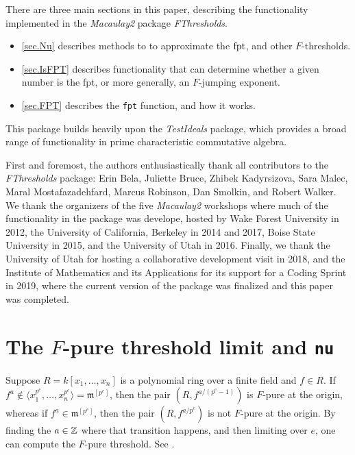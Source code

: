 \documentclass{amsart}
\newcommand{\fram}{\mathfrak{m}}
\begin{document}
There are three main sections in this paper, describing the functionality implemented in the \emph{Macaulay2} package \emph{FThresholds}. 
\begin{itemize}
\item{} \autoref{sec.Nu} describes methods to to approximate the $\operatorname{{fpt}}$, and other $F$-thresholds.  
\item{} \autoref{sec.IsFPT} describes functionality that can determine whether a given number is the fpt, or more generally, an $F$-jumping exponent.
\item{} \autoref{sec.FPT} describes the {\tt fpt} function, and how it works.
\end{itemize}

This package builds heavily upon the \emph{TestIdeals} package, which provides a broad range of functionality in prime characteristic commutative algebra. 


  First and foremost, the authors enthusiastically thank all contributors to the \emph{FThresholds} package:  Erin Bela, Juliette Bruce, Zhibek Kadyrsizova, Sara Malec, Maral Mostafazadehfard, Marcus Robinson, Dan Smolkin, and Robert Walker.  We thank the organizers of the five \emph{Macaulay2} workshops where much of the functionality in the package was develope, hosted by Wake Forest University in 2012, the University of California, Berkeley in 2014 and 2017, Boise State University in 2015, and the University of Utah in 2016. 
Finally, we thank the University of Utah for hosting a collaborative development visit in 2018, and the Institute of Mathematics and its Applications for its support for a Coding Sprint in 2019, where the current version of the package was finalized and this paper was completed. 

\section{The $F$-pure threshold limit and {\tt nu}}
\label{sec.Nu}

Suppose $R = k[x_1, \dots, x_n]$ is a polynomial ring over a finite field and $f \in R$.    If $f^a \notin \langle x_1^{p^e}, \dots, x_n^{p^e} \rangle = \fram^{[p^e]}$, then the pair $(R, f^{a/(p^e -1)})$ is $F$-pure at the origin, whereas if $f^a \in \fram^{[p^e]}$, then the pair $(R, f^{a/p^e})$ is not $F$-pure at the origin.  By finding the $a \in \mathbb{Z}$ where that transition happens, and then limiting over $e$, one can compute the $F$-pure threshold.  See \cite{MustataTakagiWatanabeFThresholdsAndBernsteinSato}.
\end{document}
